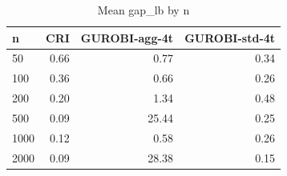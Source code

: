 \begin{table}[htbp]
\centering
\small
\caption{Mean gap\_lb by n}
\label{tab:E7_gurobi_threads_b10_by_n}
\begin{tabular}{lrrr}
\toprule
n & CRI & GUROBI-agg-4t & GUROBI-std-4t \\
\midrule
50 & 0.66 & 0.77 & 0.34 \\
100 & 0.36 & 0.66 & 0.26 \\
200 & 0.20 & 1.34 & 0.48 \\
500 & 0.09 & 25.44 & 0.25 \\
1000 & 0.12 & 0.58 & 0.26 \\
2000 & 0.09 & 28.38 & 0.15 \\
\bottomrule
\end{tabular}
\end{table}
